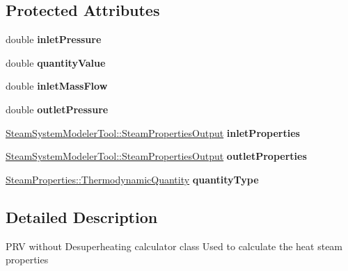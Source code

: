 \subsection*{Protected Attributes}
\begin{DoxyCompactItemize}
\item 
\mbox{\label{class_prv_without_desuperheating_a8f1d315821748bd700fef0d2a5de3288}} 
double {\bfseries inlet\+Pressure}
\item 
\mbox{\label{class_prv_without_desuperheating_af0c27d96497457d54de7fd24942e4e17}} 
double {\bfseries quantity\+Value}
\item 
\mbox{\label{class_prv_without_desuperheating_af22013b5a0da5d5e142ef082f7a35c65}} 
double {\bfseries inlet\+Mass\+Flow}
\item 
\mbox{\label{class_prv_without_desuperheating_a008e27221594b39b30fe10679d6f51ef}} 
double {\bfseries outlet\+Pressure}
\item 
\mbox{\label{class_prv_without_desuperheating_a3d22394feb1e6689717f8c0d08d9467a}} 
\hyperlink{struct_steam_system_modeler_tool_1_1_steam_properties_output}{Steam\+System\+Modeler\+Tool\+::\+Steam\+Properties\+Output} {\bfseries inlet\+Properties}
\item 
\mbox{\label{class_prv_without_desuperheating_aaa8ba23aaab48ae9b4ec03db70705d46}} 
\hyperlink{struct_steam_system_modeler_tool_1_1_steam_properties_output}{Steam\+System\+Modeler\+Tool\+::\+Steam\+Properties\+Output} {\bfseries outlet\+Properties}
\item 
\mbox{\label{class_prv_without_desuperheating_ad09bf3056e3b5d4348bd431618a63b37}} 
\hyperlink{class_steam_properties_ae0294bedf7d178c2d8fb6aed0f62fbff}{Steam\+Properties\+::\+Thermodynamic\+Quantity} {\bfseries quantity\+Type}
\end{DoxyCompactItemize}


\subsection{Detailed Description}
P\+RV without Desuperheating calculator class Used to calculate the heat steam properties 

